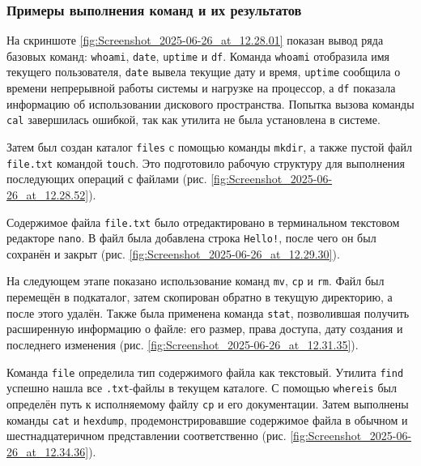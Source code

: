\subsubsection{Примеры выполнения команд и их результатов}

На скриншоте \ref{fig:Screenshot_2025-06-26_at_12.28.01} показан вывод ряда базовых команд: \texttt{whoami}, \texttt{date}, \texttt{uptime} и \texttt{df}. Команда \texttt{whoami} отобразила имя текущего пользователя, \texttt{date} вывела текущие дату и время, \texttt{uptime} сообщила о времени непрерывной работы системы и нагрузке на процессор, а \texttt{df} показала информацию об использовании дискового пространства. Попытка вызова команды \texttt{cal} завершилась ошибкой, так как утилита не была установлена в системе.

Затем был создан каталог \texttt{files} с помощью команды \texttt{mkdir}, а также пустой файл \texttt{file.txt} командой \texttt{touch}. Это подготовило рабочую структуру для выполнения последующих операций с файлами (рис. \ref{fig:Screenshot_2025-06-26_at_12.28.52}).

Содержимое файла \texttt{file.txt} было отредактировано в терминальном текстовом редакторе \texttt{nano}. В файл была добавлена строка \texttt{Hello!}, после чего он был сохранён и закрыт (рис. \ref{fig:Screenshot_2025-06-26_at_12.29.30}).

На следующем этапе показано использование команд \texttt{mv}, \texttt{cp} и \texttt{rm}. Файл был перемещён в подкаталог, затем скопирован обратно в текущую директорию, а после этого удалён. Также была применена команда \texttt{stat}, позволившая получить расширенную информацию о файле: его размер, права доступа, дату создания и последнего изменения (рис. \ref{fig:Screenshot_2025-06-26_at_12.31.35}).

Команда \texttt{file} определила тип содержимого файла как текстовый. Утилита \texttt{find} успешно нашла все \texttt{.txt}-файлы в текущем каталоге. С помощью \texttt{whereis} был определён путь к исполняемому файлу \texttt{cp} и его документации. Затем выполнены команды \texttt{cat} и \texttt{hexdump}, продемонстрировавшие содержимое файла в обычном и шестнадцатеричном представлении соответственно (рис. \ref{fig:Screenshot_2025-06-26_at_12.34.36}).

